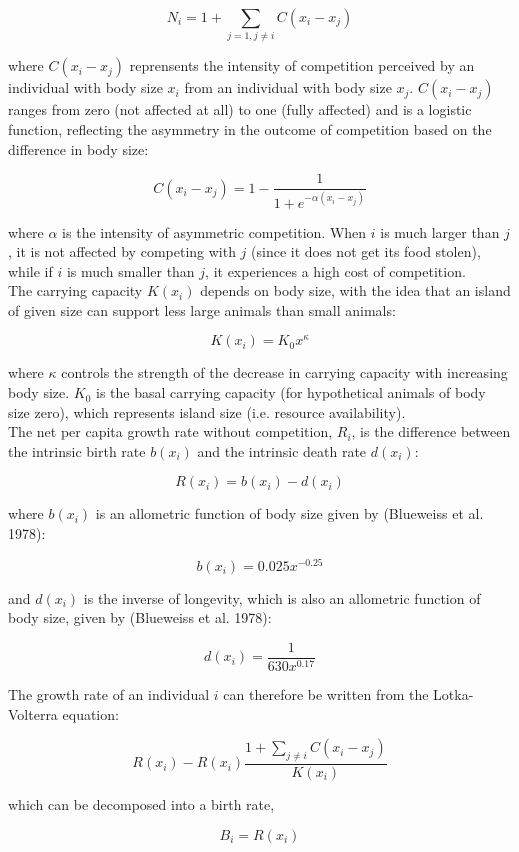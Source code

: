\documentclass[12pt]{article}
\begin{document}
\[
N_i = 1 + \sum_{j = 1, j \neq i} C(x_i - x_j)
\]

where $C(x_i - x_j)$ reprensents the intensity of competition perceived by an individual with body size $x_i$ from an individual with body size $x_j$. $C(x_i - x_j)$ ranges from zero (not affected at all) to one (fully affected) and is a logistic function, reflecting the asymmetry in the outcome of competition based on the difference in body size:

\[
C(x_i - x_j) = 1 - \frac{1}{1 + e ^{-\alpha (x_i - x_j)}}
\]

where $\alpha$ is the intensity of asymmetric competition. When $i$ is much larger than $j$, it is not affected by competing with $j$ (since it does not get its food stolen), while if $i$ is much smaller than $j$, it experiences a high cost of competition.\\

The carrying capacity $K(x_i)$ depends on body size, with the idea that an island of given size can support less large animals than small animals:

\[
K(x_i) = K_0 x ^ \kappa
\]

where $\kappa$ controls the strength of the decrease in carrying capacity with increasing body size. $K_0$ is the basal carrying capacity (for hypothetical animals of body size zero), which represents island size (i.e. resource availability).\\

The net per capita growth rate without competition, $R_i$, is the difference between the intrinsic birth rate $b(x_i)$ and the intrinsic death rate $d(x_i)$:

\[
R(x_i) = b(x_i) - d(x_i)
\]

where $b(x_i)$ is an allometric function of body size given by (Blueweiss et al. 1978):

\[
b(x_i) = 0.025 x ^{-0.25}
\]

and $d(x_i)$ is the inverse of longevity, which is also an allometric function of body size, given by (Blueweiss et al. 1978):

\[
d(x_i) = \frac{1}{630 x ^ {0.17}}
\]

The growth rate of an individual $i$ can therefore be written from the Lotka-Volterra equation:

\[
R(x_i) - R(x_i) \frac{1 + \sum_{j \neq i} C(x_i - x_j)}{K(x_i)}
\]

which can be decomposed into a birth rate,

\[
B_i = R(x_i)
\]
\end{document}
